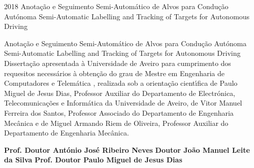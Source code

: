 \documentclass[11pt,twoside,a4paper]{report}
\def\ThesisYear{2018}
\begin{document}
%
%

\TitlePage
  \HEADER{\BAR} %
         {\ThesisYear}
        {Anota\c c\~ ao e Seguimento Semi-Autom\'atico de Alvos para Condu\c c\~ ao Aut\'onoma \newline Semi-Automatic Labelling and Tracking of Targets for Autonomous Driving}
\EndTitlePage
\titlepage\ \endtitlepage %

%
%

\TitlePage
  \HEADER{}{\ThesisYear}
        {Anota\c c\~ ao e Seguimento Semi-Autom\'atico de Alvos para Condu\c c\~ ao Aut\'onoma \newline Semi-Automatic Labelling and Tracking of Targets for Autonomous Driving}
  \vspace*{15mm}
  \TEXT{}
       {Disserta\c c\~ao apresentada \`a Universidade de Aveiro para cumprimento dos requesitos
        necess\'arios \`a obten\c c\~ao do grau de Mestre em Engenharia de Computadores e Telem\'atica , realizada sob a orienta\c c\~ao
        cient\'\i fica de Paulo Miguel de Jesus Dias, Professor Auxiliar do Departamento de Electr\'onica, Telecomunica\c c\~oes e Inform\'atica da Universidade de Aveiro, de Vitor Manuel Ferreira dos Santos, Professor Associado do Departamento de Engenharia Mec\^ anica e de Miguel Armando Riem de Oliveira, Professor Auxiliar do Departamento de Engenharia Mec\^ anica.}
\EndTitlePage
\titlepage\ \endtitlepage %

\TitlePage
  \vspace*{55mm}
       {}
       {\textbf{Prof. Doutor Ant\'onio Jos\'e Ribeiro Neves}}
  \vspace*{5mm}
       {\textbf{Doutor Jo\~ao Manuel Leite da Silva}}
  \vspace*{5mm}
  \TEXT{}
       {\textbf{Prof. Doutor Paulo Miguel de Jesus Dias}}
\EndTitlePage
\titlepage\ \endtitlepage %
\end{document}
